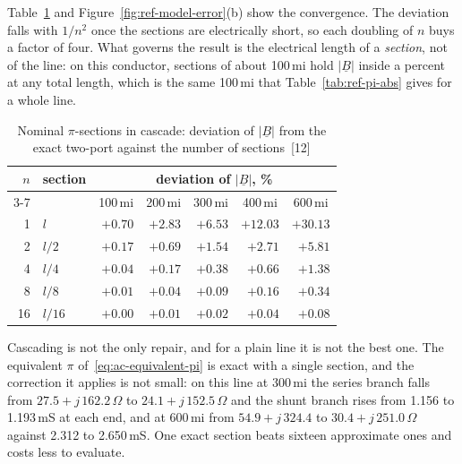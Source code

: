 Table~\ref{tab:ref-cascade} and Figure~\ref{fig:ref-model-error}(b) show the
convergence. The deviation falls with $1/n^2$ once the sections are
electrically short, so each doubling of $n$ buys a factor of four. What
governs the result is the electrical length of a \emph{section}, not of the
line: on this conductor, sections of about 100\,mi hold
$\left|\underline{B}\right|$ inside a percent at any total length, which is
the same 100\,mi that Table~\ref{tab:ref-pi-abs} gives for a whole line.

\begin{table}[!ht]
  \centering
  \begin{tabular}{@{}r l r r r r r@{}}
    \toprule
    \textbf{$n$} & \textbf{section}
      & \multicolumn{5}{c}{deviation of $\left|\underline{B}\right|$, \%} \\
    \cmidrule(lr){3-7}
    & & \multicolumn{1}{c}{100\,mi} & \multicolumn{1}{c}{200\,mi}
      & \multicolumn{1}{c}{300\,mi} & \multicolumn{1}{c}{400\,mi}
      & \multicolumn{1}{c}{600\,mi} \\
    \midrule
     1 & $l$      & $+0.70$ & $+2.83$ & $+6.53$ & $+12.03$ & $+30.13$ \\
     2 & $l/2$    & $+0.17$ & $+0.69$ & $+1.54$ &  $+2.71$ &  $+5.81$ \\
     4 & $l/4$    & $+0.04$ & $+0.17$ & $+0.38$ &  $+0.66$ &  $+1.38$ \\
     8 & $l/8$    & $+0.01$ & $+0.04$ & $+0.09$ &  $+0.16$ &  $+0.34$ \\
    16 & $l/16$   & $+0.00$ & $+0.01$ & $+0.02$ &  $+0.04$ &  $+0.08$ \\
    \bottomrule
  \end{tabular}
  \caption{Nominal $\pi$-sections in cascade: deviation of
           $\left|\underline{B}\right|$ from the exact two-port against the
           number of sections~[12]}
  \label{tab:ref-cascade}
\end{table}

Cascading is not the only repair, and for a plain line it is not the best
one. The equivalent $\pi$ of~\eqref{eq:ac-equivalent-pi} is exact with a
single section, and the correction it applies is not small: on this line at
300\,mi the series branch falls from $27.5 + j\,162.2\,\Omega$ to $24.1 +
j\,152.5\,\Omega$ and the shunt branch rises from 1.156 to 1.193\,mS at each
end, and at 600\,mi from $54.9 + j\,324.4$ to $30.4 + j\,251.0\,\Omega$
against 2.312 to 2.650\,mS. One exact section beats sixteen approximate
ones and costs less to evaluate.


